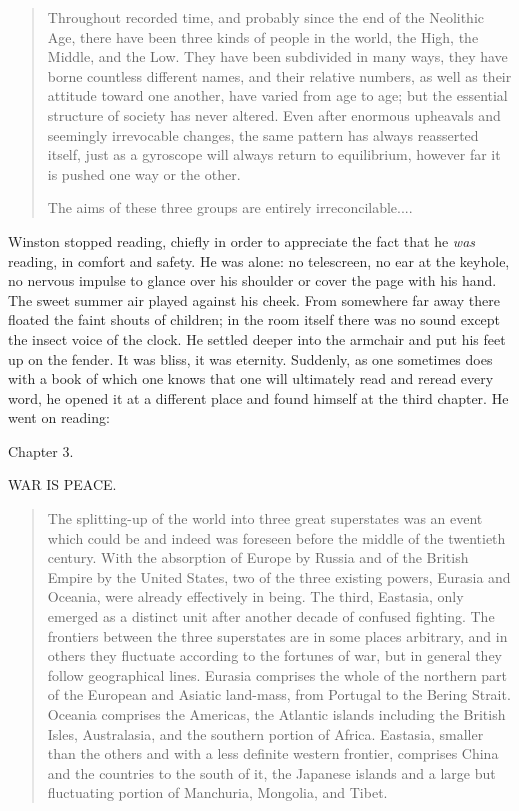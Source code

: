 \begin{quotation}
Throughout recorded time, and probably since the end of the Neolithic
Age, there have been three kinds of people in the world, the High, the
Middle, and the Low. They have been subdivided in many ways, they have
borne countless different names, and their relative numbers, as well as
their attitude toward one another, have varied from age to age; but the
essential structure of society has never altered. Even after enormous
upheavals and seemingly irrevocable changes, the same pattern has always
reasserted itself, just as a gyroscope will always return to
equilibrium, however far it is pushed one way or the other.\par
The aims of these three groups are entirely irreconcilable....
\end{quotation}

Winston stopped reading, chiefly in order to appreciate the fact that he
\emph{was} reading, in comfort and safety. He was alone: no telescreen,
no ear at the keyhole, no nervous impulse to glance over his shoulder or
cover the page with his hand. The sweet summer air played against his
cheek. From somewhere far away there floated the faint shouts of
children; in the room itself there was no sound except the insect voice
of the clock. He settled deeper into the armchair and put his feet up on
the fender. It was bliss, it was eternity. Suddenly, as one sometimes
does with a book of which one knows that one will ultimately read and
reread every word, he opened it at a different place and found himself
at the third chapter. He went on reading:

\begin{center}
Chapter 3.\par
WAR IS PEACE.
\end{center}

\begin{quotation}
The splitting-up of the world into three great superstates was an event
which could be and indeed was foreseen before the middle of the
twentieth century. With the absorption of Europe by Russia and of the
British Empire by the United States, two of the three existing powers,
Eurasia and Oceania, were already effectively in being. The third,
Eastasia, only emerged as a distinct unit after another decade of
confused fighting. The frontiers between the three superstates are in
some places arbitrary, and in others they fluctuate according to the
fortunes of war, but in general they follow geographical lines. Eurasia
comprises the whole of the northern part of the European and Asiatic
land-mass, from Portugal to the Bering Strait. Oceania comprises the
Americas, the Atlantic islands including the British Isles, Australasia,
and the southern portion of Africa. Eastasia, smaller than the others
and with a less definite western frontier, comprises China and the
countries to the south of it, the Japanese islands and a large but
fluctuating portion of Manchuria, Mongolia, and Tibet.
\end{quotation}

